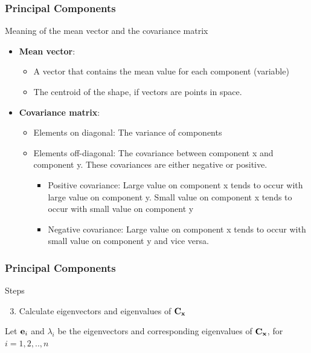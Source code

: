 \documentclass[english,11pt,table,handout]{beamer}
\begin{document}
\frame
{
	\frametitle{Principal Components}
	\large
	\begin{block}{Meaning of the mean vector and the covariance matrix}
		\begin{itemize}
			\item \alert{\textbf{Mean vector}}:  
				\begin{itemize}
					\item A vector that contains the mean value for each component (variable) 
					\item The centroid of the shape, if vectors are points in space.
				\end{itemize}
			\item \alert{\textbf{Covariance matrix}}:  
				\begin{itemize}
					\item Elements on diagonal: The variance of components
					\item Elements off-diagonal: The covariance between component x and component y. These covariances are either negative or positive.
					\begin{itemize}
						\item Positive covariance: Large value on component x tends to occur with large value on component y. Small value on component x tends to occur with small value on component y
						\item Negative covariance: Large value on component x tends to occur with small value on component y and vice versa.
					\end{itemize}
				\end{itemize}
		\end{itemize}
	\end{block}
}

\frame
{
	\frametitle{Principal Components}
	\large
	\begin{block}{Steps}
		\begin{enumerate}
			\setcounter{enumi}{2}
			\item Calculate eigenvectors and eigenvalues of $\text{\textbf{C}}_\text{\textbf{x}} $
		\end{enumerate}
		Let $\text{\textbf{e}}_i $ and $\lambda_i $ be the eigenvectors and corresponding eigenvalues of $\text{\textbf{C}}_\text{\textbf{x}} $, for $i = 1, 2, .., n$
	\end{block}
}
\end{document}
